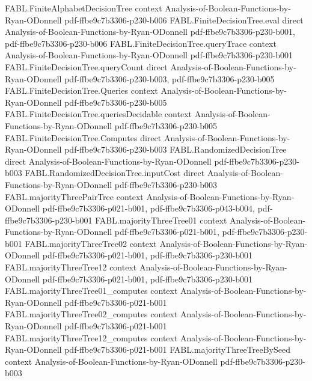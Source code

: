 \begin{theorem}
  {FABL.FiniteAlphabetDecisionTree}
  {context}
  {Analysis-of-Boolean-Functions-by-Ryan-ODonnell}
  {pdf-ffbe9c7b3306-p230-b006}
\proofstep
  {FABL.FiniteDecisionTree.eval}
  {direct}
  {Analysis-of-Boolean-Functions-by-Ryan-ODonnell}
  {pdf-ffbe9c7b3306-p230-b001,
    pdf-ffbe9c7b3306-p230-b006}
\proofstep
  {FABL.FiniteDecisionTree.queryTrace}
  {context}
  {Analysis-of-Boolean-Functions-by-Ryan-ODonnell}
  {pdf-ffbe9c7b3306-p230-b001}
\proofstep
  {FABL.FiniteDecisionTree.queryCount}
  {direct}
  {Analysis-of-Boolean-Functions-by-Ryan-ODonnell}
  {pdf-ffbe9c7b3306-p230-b003,
    pdf-ffbe9c7b3306-p230-b005}
\proofstep
  {FABL.FiniteDecisionTree.Queries}
  {context}
  {Analysis-of-Boolean-Functions-by-Ryan-ODonnell}
  {pdf-ffbe9c7b3306-p230-b005}
\proofstep
  {FABL.FiniteDecisionTree.queriesDecidable}
  {context}
  {Analysis-of-Boolean-Functions-by-Ryan-ODonnell}
  {pdf-ffbe9c7b3306-p230-b005}
\proofstep
  {FABL.FiniteDecisionTree.Computes}
  {direct}
  {Analysis-of-Boolean-Functions-by-Ryan-ODonnell}
  {pdf-ffbe9c7b3306-p230-b003}
\proofstep
  {FABL.RandomizedDecisionTree}
  {direct}
  {Analysis-of-Boolean-Functions-by-Ryan-ODonnell}
  {pdf-ffbe9c7b3306-p230-b003}
\proofstep
  {FABL.RandomizedDecisionTree.inputCost}
  {direct}
  {Analysis-of-Boolean-Functions-by-Ryan-ODonnell}
  {pdf-ffbe9c7b3306-p230-b003}
\proofstep
  {FABL.majorityThreePairTree}
  {context}
  {Analysis-of-Boolean-Functions-by-Ryan-ODonnell}
  {pdf-ffbe9c7b3306-p021-b001,
    pdf-ffbe9c7b3306-p043-b004,
    pdf-ffbe9c7b3306-p230-b001}
\proofstep
  {FABL.majorityThreeTree01}
  {context}
  {Analysis-of-Boolean-Functions-by-Ryan-ODonnell}
  {pdf-ffbe9c7b3306-p021-b001,
    pdf-ffbe9c7b3306-p230-b001}
\proofstep
  {FABL.majorityThreeTree02}
  {context}
  {Analysis-of-Boolean-Functions-by-Ryan-ODonnell}
  {pdf-ffbe9c7b3306-p021-b001,
    pdf-ffbe9c7b3306-p230-b001}
\proofstep
  {FABL.majorityThreeTree12}
  {context}
  {Analysis-of-Boolean-Functions-by-Ryan-ODonnell}
  {pdf-ffbe9c7b3306-p021-b001,
    pdf-ffbe9c7b3306-p230-b001}
\proofstep
  {FABL.majorityThreeTree01_computes}
  {context}
  {Analysis-of-Boolean-Functions-by-Ryan-ODonnell}
  {pdf-ffbe9c7b3306-p021-b001}
\proofstep
  {FABL.majorityThreeTree02_computes}
  {context}
  {Analysis-of-Boolean-Functions-by-Ryan-ODonnell}
  {pdf-ffbe9c7b3306-p021-b001}
\proofstep
  {FABL.majorityThreeTree12_computes}
  {context}
  {Analysis-of-Boolean-Functions-by-Ryan-ODonnell}
  {pdf-ffbe9c7b3306-p021-b001}
\proofstep
  {FABL.majorityThreeTreeBySeed}
  {context}
  {Analysis-of-Boolean-Functions-by-Ryan-ODonnell}
  {pdf-ffbe9c7b3306-p230-b003}
\proofstep

\end{theorem}
